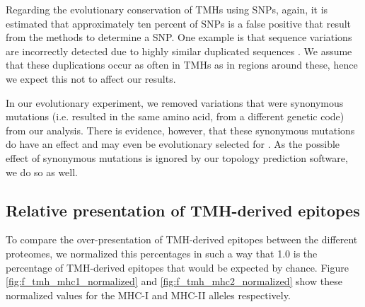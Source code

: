 Regarding the evolutionary conservation of TMHs using SNPs,
again, it is estimated that approximately ten percent
of SNPs is a false positive that result from the methods to determine
a SNP. One example is that sequence variations are incorrectly
detected due to highly similar duplicated sequences \cite{musumeci2010single}.
We assume that these duplications occur as often in TMHs as in
regions around these, hence we expect this not to affect our results.

%
In our evolutionary experiment, 
we removed variations that were synonymous mutations (i.e.
resulted in the same amino acid, from a different genetic code) 
from our analysis.
There is evidence, however, that these synonymous mutations
do have an effect and may even be evolutionary selected 
for \cite{hunt2009silent}.
As the possible effect of synonymous mutations is ignored by our
topology prediction software, we do so as well.

\clearpage

\subsection{Relative presentation of TMH-derived epitopes}

To compare the over-presentation of TMH-derived epitopes between the
different proteomes, we normalized this percentages in such a
way that 1.0 is the percentage of TMH-derived epitopes that would 
be expected by chance. 
Figure \ref{fig:f_tmh_mhc1_normalized} and \ref{fig:f_tmh_mhc2_normalized}
show these normalized values for the MHC-I and MHC-II alleles respectively.

